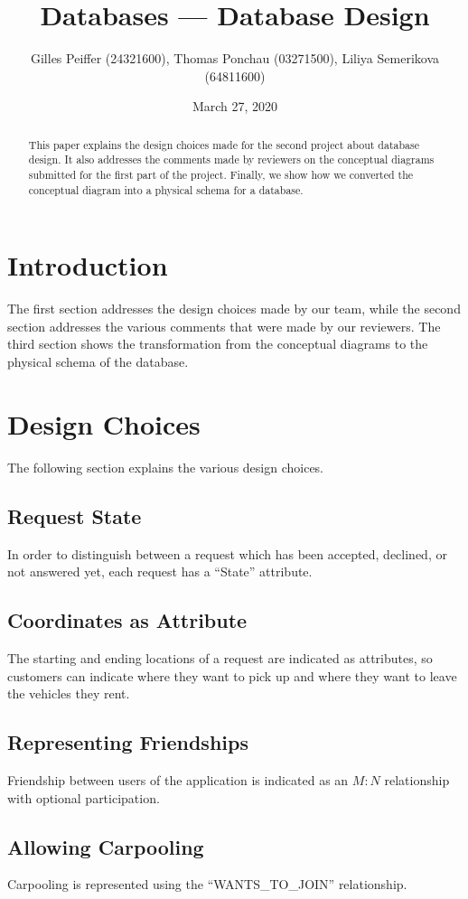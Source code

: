 \documentclass[journal, 9pt]{IEEEtran}
\title{Databases --- Database Design}
\author{Gilles Peiffer (24321600), Thomas Ponchau (03271500), Liliya Semerikova (64811600)}
\date{March 27, 2020}
\theoremstyle{definition}
\begin{document}
\maketitle

\begin{abstract}
	This paper explains the design choices made for the second project about database design.
	It also addresses the comments made by reviewers on the conceptual diagrams submitted for the first part of the project.
	Finally, we show how we converted the conceptual diagram into a physical schema for a database.
\end{abstract}

\section*{Introduction}
The first section addresses the design choices made by our team, while the second section addresses the various comments that were made by our reviewers.
The third section shows the transformation from the conceptual diagrams to the physical schema of the database.

\section{Design Choices}
The following section explains the various design choices.

\subsection{Request State}
In order to distinguish between a request which has been accepted, declined, or not answered yet, each request has a ``State'' attribute.

\subsection{Coordinates as Attribute}
The starting and ending locations of a request are indicated as attributes, so customers can indicate where they want to pick up and where they want to leave the vehicles they rent.

\subsection{Representing Friendships}
Friendship between users of the application is indicated as an \(M:N\) relationship with optional participation.

\subsection{Allowing Carpooling}
Carpooling is represented using the ``WANTS\_TO\_JOIN'' relationship.
\end{document}

